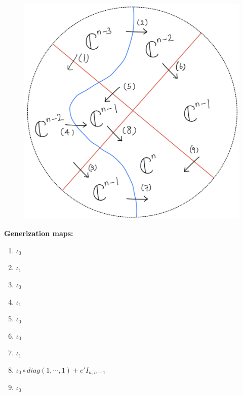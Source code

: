 \begin{figure}[H]
    \centering
    \includegraphics[scale = 0.95]{diagrams/cobord'4/33.png}
    \caption{}
    \label{fig:your-label}
\end{figure}
\textbf{Generization maps:}
\begin{enumerate}[label = (\arabic*)]
\item $\iota_0$

\item $\iota_1$

\item $\iota_0$

\item $\iota_1$

\item $\iota_0$

\item $\iota_0$

\item $\iota_1$

\item $\iota_0 \circ diag(1,\cdots,1) + e' I_{n,n-1}$

\item $\iota_0$
\end{enumerate}

